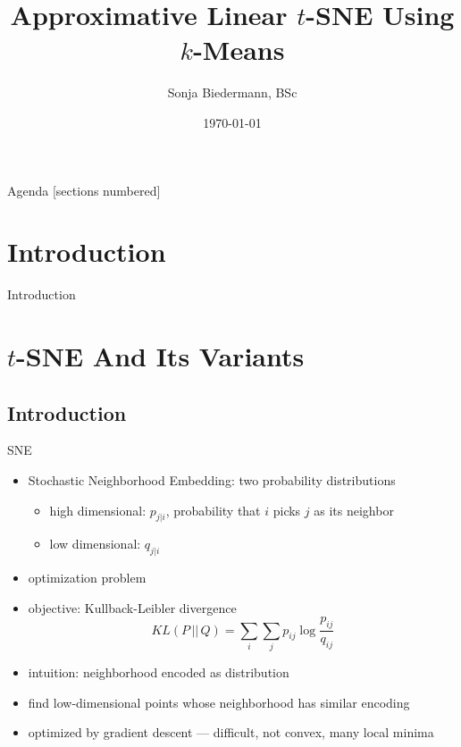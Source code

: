 \documentclass{beamer}
\title{Approximative Linear $t$-SNE Using $k$-Means}
\date{\today}
\author{Sonja Biedermann, BSc}
\institute{Fakultät für Informatik\\Universität Wien}
\begin{document}
\maketitle

\begin{frame}{Agenda}
    [sections numbered]
    \setcounter{tocdepth}{1}
    \tableofcontents
\end{frame}

\section{Introduction}

\begin{frame}[fragile]{Introduction}
\end{frame}

\section{$t$-SNE And Its Variants}

\subsection{Introduction}

\begin{frame}[fragile]{SNE}
    \begin{itemize}
        \item Stochastic Neighborhood Embedding: two probability distributions
            \begin{itemize}
                \item high dimensional: $p_{j | i}$, probability that $i$ picks $j$ as its neighbor
                \item low dimensional: $q_{j | i}$
            \end{itemize}
        \item optimization problem
        \item objective: Kullback-Leibler divergence
            \[
                KL(P \, || \, Q) = \sum_i \sum_j p_{ij} \log \frac{p_{ij}}{q_{ij}}
            \]
        \item intuition: neighborhood encoded as distribution
        \item find low-dimensional points whose neighborhood has similar encoding
        \item optimized by gradient descent --- difficult, not convex, many local minima
    \end{itemize}
\end{frame}
\end{document}
